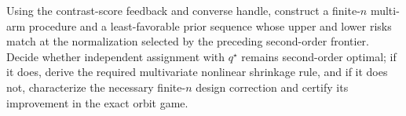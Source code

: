 Using the contrast-score feedback and converse handle, construct a finite-\(n\) multi-arm procedure and a least-favorable prior sequence whose upper and lower risks match at the normalization selected by the preceding second-order frontier. Decide whether independent assignment with \(q^\star\) remains second-order optimal; if it does, derive the required multivariate nonlinear shrinkage rule, and if it does not, characterize the necessary finite-\(n\) design correction and certify its improvement in the exact orbit game.